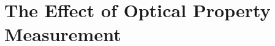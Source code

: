 %
%
%
%
%
%
%
%
%
%
%
%
%
%
%
%
%
%
%
%
%
%
%
%
%
%
%
%
%
%
%
%
%
%
%
%
%
%
%
%
%


\section {The Effect of Optical Property Measurement}
